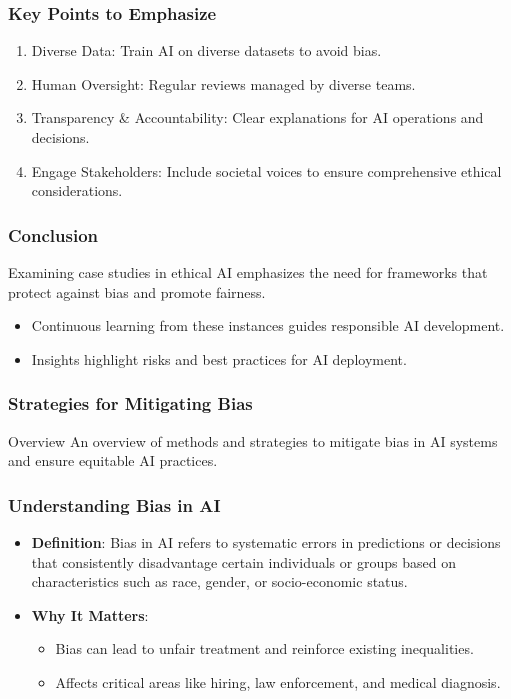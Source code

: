 \documentclass[aspectratio=169]{beamer}
\begin{document}
\begin{frame}[fragile]
    \frametitle{Key Points to Emphasize}
    \begin{enumerate}
        \item Diverse Data: Train AI on diverse datasets to avoid bias.
        \item Human Oversight: Regular reviews managed by diverse teams.
        \item Transparency \& Accountability: Clear explanations for AI operations and decisions.
        \item Engage Stakeholders: Include societal voices to ensure comprehensive ethical considerations.
    \end{enumerate}
\end{frame}

\begin{frame}[fragile]
    \frametitle{Conclusion}
    Examining case studies in ethical AI emphasizes the need for frameworks that protect against bias and promote fairness. 
    \begin{itemize}
        \item Continuous learning from these instances guides responsible AI development.
        \item Insights highlight risks and best practices for AI deployment.
    \end{itemize}
\end{frame}

\begin{frame}[fragile]
    \frametitle{Strategies for Mitigating Bias}
    \begin{block}{Overview}
        An overview of methods and strategies to mitigate bias in AI systems and ensure equitable AI practices.
    \end{block}
\end{frame}

\begin{frame}[fragile]
    \frametitle{Understanding Bias in AI}
    \begin{itemize}
        \item \textbf{Definition}: Bias in AI refers to systematic errors in predictions or decisions that consistently disadvantage certain individuals or groups based on characteristics such as race, gender, or socio-economic status.
        \item \textbf{Why It Matters}: 
        \begin{itemize}
            \item Bias can lead to unfair treatment and reinforce existing inequalities.
            \item Affects critical areas like hiring, law enforcement, and medical diagnosis.
        \end{itemize}
    \end{itemize}
\end{frame}
\end{document}
